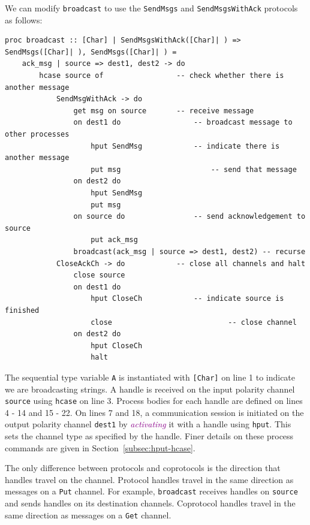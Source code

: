 \documentclass[acmsmall]{acmart}
\newcommand{\tc}[1]{\textcolor{darkMagenta}{\textit{#1}}}
\begin{document}
We can modify \lstinline$broadcast$ to use the \lstinline$SendMsgs$ and \lstinline$SendMsgsWithAck$ protocols as follows:
\begin{lstlisting}[label=ex:recbroadcast, caption=Process that broadcasts messages from a single source]
proc broadcast :: [Char] | SendMsgsWithAck([Char]| ) => SendMsgs([Char]| ), SendMsgs([Char]| ) = 
	ack_msg | source => dest1, dest2 -> do
		hcase source of					-- check whether there is another message
			SendMsgWithAck -> do
				get msg on source		-- receive message
				on dest1 do					-- broadcast message to other processes
					hput SendMsg			-- indicate there is another message
					put msg						-- send that message
				on dest2 do
					hput SendMsg
					put msg
				on source do				-- send acknowledgement to source
					put ack_msg
				broadcast(ack_msg | source => dest1, dest2) -- recurse
			CloseAckCh -> do			-- close all channels and halt
				close source							
				on dest1 do						
					hput CloseCh			-- indicate source is finished
					close							-- close channel
				on dest2 do
					hput CloseCh	
					halt	
\end{lstlisting}
The sequential type variable \lstinline$A$ is instantiated with \lstinline$[Char]$ on line 1 to indicate we are broadcasting strings.
A handle is received on the input polarity channel \lstinline$source$ using \lstinline$hcase$ on line 3.
Process bodies for each handle are defined on lines 4 - 14 and 15 - 22.
On lines 7 and 18, a communication session is initiated on the output polarity channel \lstinline$dest1$ by \tc{activating} it with a handle using \lstinline$hput$.
This sets the channel type as specified by the handle. 
Finer details on these process commands are given in Section~\ref{subsec:hput-hcase}.

The only difference between protocols and coprotocols is the direction that handles travel on the channel.
Protocol handles travel in the same direction as messages on a \lstinline$Put$ channel.
For example, \lstinline$broadcast$ receives handles on \lstinline$source$ and sends handles on its destination channels.
Coprotocol handles travel in the same direction as messages on a \lstinline$Get$ channel.
\end{document}
